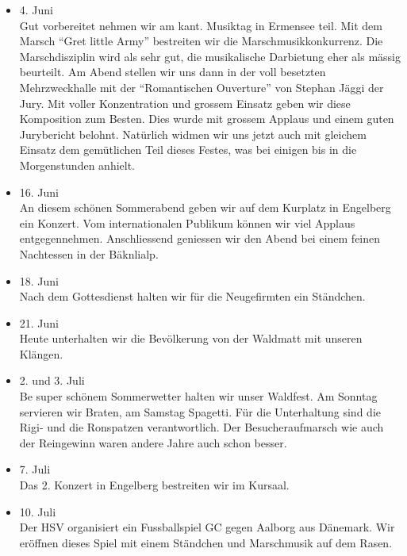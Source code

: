 \begin{history}
\begin{itemize}
        \item[]4. Juni\\
        Gut vorbereitet nehmen wir am kant. Musiktag in Ermensee teil. Mit dem
        Marsch \enquote{Gret little Army} bestreiten wir die
        Marschmusikkonkurrenz. Die Marschdisziplin wird als sehr gut, die
        musikalische Darbietung eher als mässig beurteilt. Am Abend stellen wir
        uns dann in der voll besetzten Mehrzweckhalle mit der
        \enquote{Romantischen Ouverture} von Stephan Jäggi der Jury. Mit voller
        Konzentration und grossem Einsatz geben wir diese Komposition zum
        Besten. Dies wurde mit grossem Applaus und einem guten Jurybericht
        belohnt. Natürlich widmen wir uns jetzt auch mit gleichem Einsatz dem
        gemütlichen Teil dieses Festes, was bei einigen bis in die Morgenstunden
        anhielt.

        \item[]16. Juni\\
        An diesem schönen Sommerabend geben wir auf dem Kurplatz in Engelberg
        ein Konzert. Vom internationalen Publikum können wir viel Applaus
        entgegennehmen. Anschliessend geniessen wir den Abend bei einem feinen
        Nachtessen in der Bäknlialp.

        \item[]18. Juni\\
        Nach dem Gottesdienst halten wir für die Neugefirmten ein Ständchen.

        \item[]21. Juni\\
        Heute unterhalten wir die Bevölkerung von der Waldmatt mit unseren
        Klängen.

        \item[]2. und 3. Juli\\
        Be super schönem Sommerwetter halten wir unser Waldfest. Am Sonntag
        servieren wir Braten, am Samstag Spagetti. Für die Unterhaltung sind die
        Rigi- und die Ronspatzen verantwortlich. Der Besucheraufmarsch wie auch
        der Reingewinn waren andere Jahre auch schon besser.

        \item[]7. Juli\\
        Das 2. Konzert in Engelberg bestreiten wir im Kursaal.

        \item[]10. Juli\\
        Der HSV organisiert ein Fussballspiel GC gegen Aalborg aus Dänemark. Wir
        eröffnen dieses Spiel mit einem Ständchen und Marschmusik auf dem Rasen.


\end{itemize}
\end{history}
